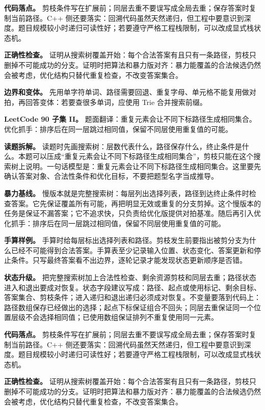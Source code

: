 \textbf{代码落点。} 剪枝条件写在扩展前；同层去重不要误写成全局去重；保存答案时复制当前路径。C++ 侧还要落实：回溯代码虽然天然递归，但工程中要意识到深度。题目规模较小时递归可读性好；若要遵守严格工程栈限制，可以改成显式栈状态机。

\textbf{正确性检查。} 证明从搜索树覆盖开始：每个合法答案有且只有一条路径，剪枝只删掉不可能成功的分支。证明时把算法和暴力版对齐：暴力能覆盖的合法候选仍然会被考虑，优化结构只替代重复检查，不改变答案集合。

\textbf{边界和变体。} 先用单字符单词、路径需要回退、重复字母、单元格不能复用做对拍，再回答变体：若要查很多单词，应使用 Trie 合并搜索前缀。

\noindent\textbf{LeetCode 90 子集 II。} 题面翻译：重复元素会让不同下标路径生成相同集合。优化抓手：排序后在同一层跳过相同值，保留不同层使用重复值的可能。

\textbf{读题拆解。} 读题时先画搜索树：层数代表什么，路径保存什么，终止条件是什么。本题可以压成“重复元素会让不同下标路径生成相同集合”，剪枝只能在这个搜索树上说明。一句话模型是：重复元素会让不同下标路径生成相同集合。这里要先确认答案对象、合法性条件和优化目标，不要把题型名字当成推导。

\textbf{暴力基线。} 慢版本就是完整搜索树：每层列出选择列表，路径到达终止条件时检查答案。它先保证覆盖所有可能，再把明显无效或重复的分支剪掉。这个慢版本的任务是保证不漏答案；它不追求快，只负责给优化版提供对拍基准。随后再引入优化抓手：排序后在同一层跳过相同值，保留不同层使用重复值的可能。

\textbf{手算样例。} 手算时给每层标出选择列表和路径。剪枝发生前要指出被剪分支为什么已经不可能得到合法答案。手算表至少记录输入位置、状态变化、答案更新和停止条件。只写最终答案看不出边界，逐轮记录才能发现状态更新顺序是否错。

\textbf{状态升级。} 把完整搜索树加上合法性检查、剩余资源剪枝和同层去重；路径状态进入和退出要成对恢复。状态字段建议写成：路径、起点或使用标记、剩余目标、答案集合、剪枝条件；进入递归和退出递归必须成对恢复。不变量要落到代码上：路径数组保存已经做出的选择；起点下标保证组合不回头；同层去重保证同一个位置层级不会选择相同值；已使用数组保证排列不重复使用同一元素。

\textbf{代码落点。} 剪枝条件写在扩展前；同层去重不要误写成全局去重；保存答案时复制当前路径。C++ 侧还要落实：回溯代码虽然天然递归，但工程中要意识到深度。题目规模较小时递归可读性好；若要遵守严格工程栈限制，可以改成显式栈状态机。

\textbf{正确性检查。} 证明从搜索树覆盖开始：每个合法答案有且只有一条路径，剪枝只删掉不可能成功的分支。证明时把算法和暴力版对齐：暴力能覆盖的合法候选仍然会被考虑，优化结构只替代重复检查，不改变答案集合。

